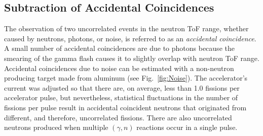 \documentclass[%
 reprint,
 amsmath,amssymb,
 aps,
 nofootinbib
]{revtex4-1}
\begin{document}
\subsection{Subtraction of Accidental Coincidences}
\label{Reconstruction of Accidental Coincidence}
The observation of two uncorrelated events in the neutron ToF range, whether caused by neutrons, photons, or noise, is referred to as an \emph{accidental coincidence}.
A small number of accidental coincidences are due to photons because the smearing of the gamma flash causes it to slightly overlap with neutron ToF range.
Accidental coincidences due to noise can be estimated with a non-neutron producing target made from aluminum (see Fig.~\ref{fig:Noise}).
The accelerator's current was adjusted so that there are, on average, less than 1.0 fissions per accelerator pulse, but nevertheless, statistical fluctuations in the number of fissions per pulse result in accidental coincident neutrons that originated from different, and therefore, uncorrelated fissions.
There are also uncorrelated neutrons produced when multiple $(\gamma, n)$ reactions occur in a single pulse.
\end{document}
